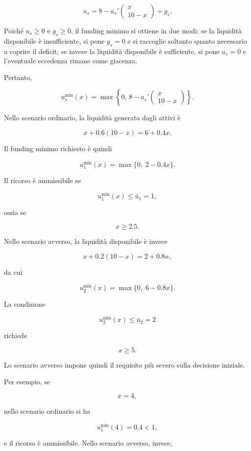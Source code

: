 \[
u_s=
8-
a_s'
\begin{pmatrix}
x\\
10-x
\end{pmatrix}
+g_s.
\]

Poich\'{e} $u_s\geq0$ e $g_s\geq0$, il funding
minimo si ottiene in due modi: se la liquidit\`{a}
disponibile \`{e} insufficiente, si pone $g_s=0$
e si raccoglie soltanto quanto necessario a coprire
il deficit; se invece la liquidit\`{a} disponibile
\`{e} sufficiente, si pone $u_s=0$ e l'eventuale
eccedenza rimane come giacenza.

Pertanto,

\[
u_s^{\min}(x)
=
\max\left\{
0,\,
8-
a_s'
\begin{pmatrix}
x\\
10-x
\end{pmatrix}
\right\}.
\]



Nello scenario ordinario, la liquidit\`a generata dagli attivi \`e

\[
x+0.6(10-x)
=
6+0.4x.
\]

Il funding minimo richiesto \`e quindi

\[
u_1^{\min}(x)
=
\max\{0,\;2-0.4x\}.
\]

Il ricorso \`e ammissibile se

\[
u_1^{\min}(x)
\leq
\bar u_1=1,
\]

\noindent ossia se

\[
x\geq2.5.
\]

Nello scenario avverso, la liquidit\`a disponibile \`e invece

\[
x+0.2(10-x)
=
2+0.8x,
\]

\noindent da cui

\[
u_2^{\min}(x)
=
\max\{0,\;6-0.8x\}.
\]

La condizione

\[
u_2^{\min}(x)
\leq
\bar u_2=2
\]

\noindent richiede

\[
x\geq5.
\]

Lo scenario avverso impone quindi il requisito pi\`u severo sulla decisione
iniziale.

Per esempio, se

\[
x=4,
\]

\noindent nello scenario ordinario si ha

\[
u_1^{\min}(4)=0.4<1,
\]

\noindent e il ricorso \`e ammissibile. Nello scenario avverso, invece,

